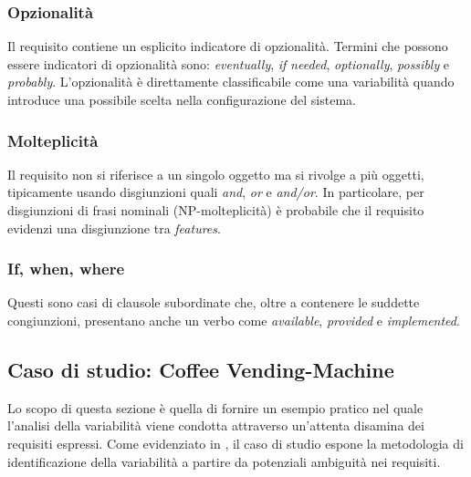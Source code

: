 \documentclass[12pt]{report}
\newcommand{\torevise}[1]{\textcolor{red}{#1}}
\begin{document}
\subsubsection{\textsf{Opzionalità}}
Il requisito contiene un esplicito indicatore di opzionalità. Termini che possono essere indicatori di opzionalità sono: \textit{eventually}, \textit{if} \textit{needed}, \textit{optionally}, \textit{possibly} e \textit{probably}. L'opzionalità è direttamente classificabile come una variabilità quando introduce una possibile scelta nella configurazione del sistema.


\subsubsection{\textsf{Molteplicità}}
Il requisito non si riferisce a un singolo oggetto ma si rivolge a più oggetti, tipicamente usando disgiunzioni quali \textit{and}, \textit{or} e \textit{and/or}. In particolare, per disgiunzioni di frasi nominali (NP-molteplicità) è probabile che il requisito evidenzi una disgiunzione tra \textit{features}.


\subsubsection{\textsf{If, when, where}}
Questi sono casi di clausole subordinate che, oltre a contenere le suddette congiunzioni, presentano anche un verbo come \textit{available}, \textit{provided} e \textit{implemented}.


\subsection{Caso di studio: \textsf{Coffee Vending-Machine}}
Lo scopo di questa sezione è quella di fornire un esempio pratico nel quale l'analisi della variabilità viene condotta attraverso un'attenta disamina dei requisiti espressi. Come evidenziato in \cite{oai:it.cnr:prodotti:474934}, il caso di studio espone la metodologia di identificazione della variabilità a partire da potenziali ambiguità nei requisiti.
\end{document}
